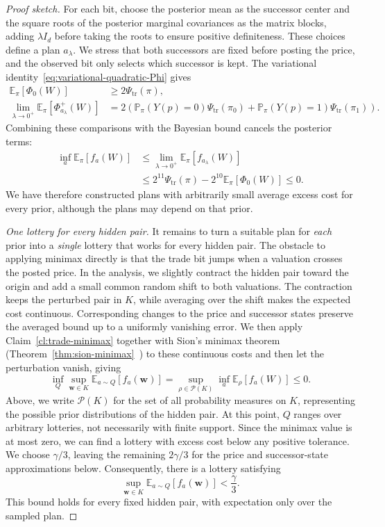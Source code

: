 \documentclass[11pt]{article}
\newcommand{\Esub}[2]{\mathbb E_{#1}\left[#2\right]}
\begin{document}
\begin{proof}[Proof sketch]
For each bit, choose the posterior mean as the successor center and the square roots of {the posterior} marginal covariances as the matrix blocks, adding $\lambda I_d$ before taking the roots to ensure positive definiteness. These choices define a plan $a_\lambda$. We stress that both successors are fixed before posting the price, and {the observed bit only selects which successor is kept}. The variational identity~\eqref{eq:variational-quadratic-Phi} gives \[ \begin{aligned} \Esub{\pi}{\Phi_0(W)}&\ge2\Psi_{\mathrm{tr}}(\pi),\\ \lim_{\lambda\to0^+}\Esub{\pi}{\Phi_{a_\lambda}^+(W)}&=2\left(\mathbb P_\pi(Y(p)=0)\Psi_{\mathrm{tr}}(\pi_0)+\mathbb P_\pi(Y(p)=1)\Psi_{\mathrm{tr}}(\pi_1)\right). \end{aligned} \tag{Potential bounds} \] 
Combining these comparisons with the Bayesian bound cancels the posterior terms: \[ \begin{aligned} \inf_a\Esub{\pi}{ f_a(W)}&\le\lim_{\lambda\to0^+}\Esub{\pi}{f_{a_\lambda}(W)}\\ &\le2^{11}\Psi_{\mathrm{tr}}(\pi)-2^{10}\Esub{\pi}{\Phi_0(W)}\le0. \end{aligned} \tag{Average bound} \] We have therefore constructed plans with arbitrarily small average excess cost for every prior, although the plans may depend on that prior.

\emph{One lottery for every hidden pair.} It remains to turn a suitable plan for \emph{each} prior into a \emph{single} lottery that works for every hidden pair. The obstacle to applying minimax directly is that the trade bit jumps when a valuation crosses the posted price. In the analysis, we slightly contract the hidden pair toward the origin and add a small common random shift to both valuations. The contraction keeps the perturbed pair in $K$, while averaging over the shift makes the expected cost continuous. Corresponding changes to the price and successor states preserve the averaged bound up to a uniformly vanishing error. We then apply Claim~\ref{cl:trade-minimax} together with Sion's minimax theorem (Theorem~\ref{thm:sion-minimax}~\cite{Sion58}) to these continuous costs {and then let the perturbation vanish}, giving 
\[
    \inf_Q\sup_{\boldsymbol w\in K}\Esub{a\sim Q}{f_a(\boldsymbol w)}=\sup_{\rho\in\mathcal P(K)}\inf_a\Esub{\rho}{f_a(W)}\le0. \tag{Minimax}
\]
Above, we write $\mathcal P(K)$ for the set of all probability measures on $K$, representing the possible prior distributions of the hidden pair. At this point, $Q$ ranges over arbitrary lotteries, not necessarily with finite support. Since the minimax value is at most zero, we can find a lottery with excess cost below any positive tolerance. We choose $\gamma/3$, leaving the remaining $2\gamma/3$ for the price and successor-state approximations below. Consequently, there is a lottery satisfying
\[
    \sup_{\boldsymbol w\in K}\Esub{a\sim Q}{f_a(\boldsymbol w)}<\frac{\gamma}{3}. \tag{Uniform bound}
\]
This bound holds for every fixed hidden pair, with expectation only over the sampled plan. 


\end{proof}
\end{document}
